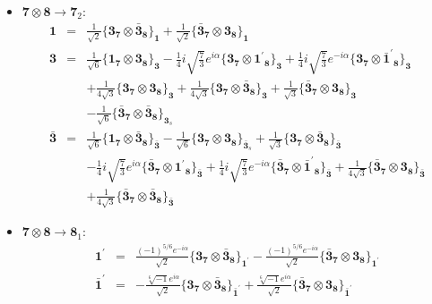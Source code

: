 \documentclass[english]{article}
\newcommand{\subcg}[3]{\big\{ {#1}\otimes{#2}\big\}^{}_{#3}}
\newcommand{\rep}[1]{\mathbf{#1}}
\begin{document}
\begin{itemize}
\item $\rep{7}\otimes\rep{8}\to\rep{7}_{2}$:
\begin{eqnarray*}
\rep{1} &=& \frac{1}{\sqrt{2}}\subcg{\rep{3}_{\rep{7}}}{\rep{\bar{3}}_{\rep{8}}}{\rep{1}}+\frac{1}{\sqrt{2}}\subcg{\rep{\bar{3}}_{\rep{7}}}{\rep{3}_{\rep{8}}}{\rep{1}}
\\
\rep{3} &=& \frac{1}{\sqrt{6}}\subcg{\rep{1}_{\rep{7}}}{\rep{3}_{\rep{8}}}{\rep{3}}-\frac{1}{4} i \sqrt{\frac{7}{3}} e^{i \alpha }\subcg{\rep{3}_{\rep{7}}}{\rep{1^{\prime}}_{\rep{8}}}{\rep{3}}+\frac{1}{4} i \sqrt{\frac{7}{3}} e^{-i \alpha }\subcg{\rep{3}_{\rep{7}}}{\rep{\bar{1}^{\prime}}_{\rep{8}}}{\rep{3}} \\ 
 & & +\frac{1}{4 \sqrt{3}}\subcg{\rep{3}_{\rep{7}}}{\rep{3}_{\rep{8}}}{\rep{3}}+\frac{1}{4 \sqrt{3}}\subcg{\rep{3}_{\rep{7}}}{\rep{\bar{3}}_{\rep{8}}}{\rep{3}}+\frac{1}{\sqrt{3}}\subcg{\rep{\bar{3}}_{\rep{7}}}{\rep{3}_{\rep{8}}}{\rep{3}} \\ 
 & & -\frac{1}{\sqrt{6}}\subcg{\rep{\bar{3}}_{\rep{7}}}{\rep{\bar{3}}_{\rep{8}}}{\rep{3}_{s}}
\\
\rep{\bar{3}} &=& \frac{1}{\sqrt{6}}\subcg{\rep{1}_{\rep{7}}}{\rep{\bar{3}}_{\rep{8}}}{\rep{\bar{3}}}-\frac{1}{\sqrt{6}}\subcg{\rep{3}_{\rep{7}}}{\rep{3}_{\rep{8}}}{\rep{\bar{3}}_{s}}+\frac{1}{\sqrt{3}}\subcg{\rep{3}_{\rep{7}}}{\rep{\bar{3}}_{\rep{8}}}{\rep{\bar{3}}} \\ 
 & & -\frac{1}{4} i \sqrt{\frac{7}{3}} e^{i \alpha }\subcg{\rep{\bar{3}}_{\rep{7}}}{\rep{1^{\prime}}_{\rep{8}}}{\rep{\bar{3}}}+\frac{1}{4} i \sqrt{\frac{7}{3}} e^{-i \alpha }\subcg{\rep{\bar{3}}_{\rep{7}}}{\rep{\bar{1}^{\prime}}_{\rep{8}}}{\rep{\bar{3}}}+\frac{1}{4 \sqrt{3}}\subcg{\rep{\bar{3}}_{\rep{7}}}{\rep{3}_{\rep{8}}}{\rep{\bar{3}}} \\ 
 & & +\frac{1}{4 \sqrt{3}}\subcg{\rep{\bar{3}}_{\rep{7}}}{\rep{\bar{3}}_{\rep{8}}}{\rep{\bar{3}}}
\end{eqnarray*}
\item $\rep{7}\otimes\rep{8}\to\rep{8}_{1}$:
\begin{eqnarray*}
\rep{1^{\prime}} &=& \frac{(-1)^{5/6} e^{-i \alpha }}{\sqrt{2}}\subcg{\rep{3}_{\rep{7}}}{\rep{\bar{3}}_{\rep{8}}}{\rep{1^{\prime}}}-\frac{(-1)^{5/6} e^{-i \alpha }}{\sqrt{2}}\subcg{\rep{\bar{3}}_{\rep{7}}}{\rep{3}_{\rep{8}}}{\rep{1^{\prime}}}
\\
\rep{\bar{1}^{\prime}} &=& -\frac{\sqrt[6]{-1} e^{i \alpha }}{\sqrt{2}}\subcg{\rep{3}_{\rep{7}}}{\rep{\bar{3}}_{\rep{8}}}{\rep{\bar{1}^{\prime}}}+\frac{\sqrt[6]{-1} e^{i \alpha }}{\sqrt{2}}\subcg{\rep{\bar{3}}_{\rep{7}}}{\rep{3}_{\rep{8}}}{\rep{\bar{1}^{\prime}}}

\end{eqnarray*}
\end{itemize}
\end{document}
